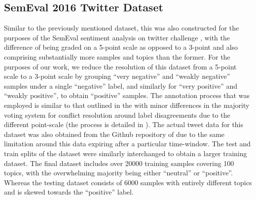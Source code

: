 \documentclass[../../fyp.tex]{subfiles}
\begin{document}
\subsection{SemEval 2016 Twitter Dataset} \label{ds:nakov}
Similar to the previously mentioned dataset, this was also constructed for the purposes of the SemEval sentiment analysis on twitter challenge \cite{nakov2016}, with the difference of being graded on a 5-point scale as opposed to a 3-point and also comprising substantially more samples and topics than the former. For the purposes of our work, we reduce the resolution of this dataset from a 5-point scale to a 3-point scale by grouping \enquote{very negative} and \enquote{weakly negative} samples under a single \enquote{negative} label, and similarly for \enquote{very positive} and \enquote{weakly positive}, to obtain \enquote{positive} samples. The annotation process that was employed is similar to that outlined in the \cite{rosenthal2015} with minor differences in the majority voting system for conflict resolution around label disagreements due to the different point-scale (the process is detailed in \cite{nakov2016}). The actual tweet data for this dataset was also obtained from the Github repository of \cite{baziotis2017} due to the same limitation around this data expiring after a particular time-window. The test and train splits of the dataset were similarly interchanged to obtain a larger training dataset. The final dataset includes over 20000 training samples covering 100 topics, with the overwhelming majority being either \enquote{neutral} or \enquote{positive}. Whereas the testing dataset consists of 6000 samples with entirely different topics and is skewed towards the \enquote{positive} label.
\end{document}
